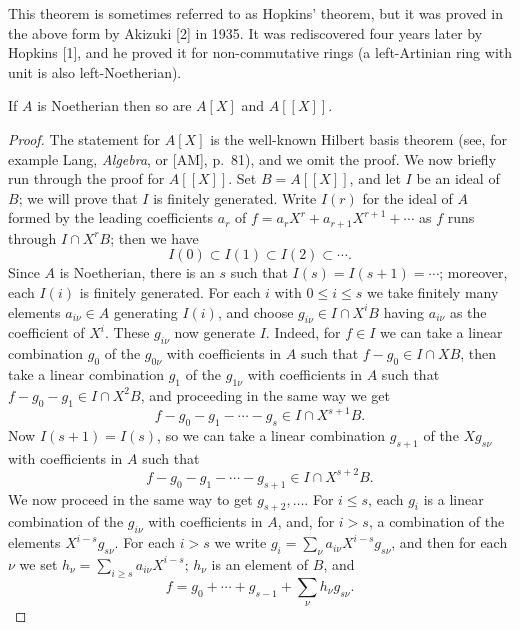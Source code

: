 \begin{remark}
This theorem is sometimes referred to as Hopkins' theorem, but it was proved in the
above form by Akizuki [2] in 1935. It was rediscovered four years later by Hopkins [1], and
he proved it for non-commutative rings (a left-Artinian ring with unit is also left-Noetherian).
\end{remark}

\begin{theorem}\label{thm:3.3}
If $A$ is Noetherian then so are $A[X]$ and $A[[X]]$.
\end{theorem}

\begin{proof}
The statement for $A[X]$ is the well-known Hilbert basis theorem
(see, for example Lang, \textit{Algebra}, or [AM], p.~81), and we omit the proof.
We now briefly run through the proof for $A[[X]]$. Set $B = A[[X]]$, and
let $I$ be an ideal of $B$; we will prove that $I$ is finitely generated. Write
$I(r)$ for the ideal of $A$ formed by the leading coefficients $a_r$ of
$f = a_rX^r + a_{r+1}X^{r+1} + \cdots$ as $f$ runs through $I \cap X^rB$; then we have
\[
  I(0) \subset I(1) \subset I(2) \subset \cdots .
\]
Since $A$ is Noetherian, there is an $s$ such that $I(s) = I(s+1) = \cdots$; moreover,
each $I(i)$ is finitely generated. For each $i$ with $0 \le i \le s$ we take finitely many
elements $a_{i\nu} \in A$ generating $I(i)$, and choose $g_{i\nu} \in I \cap X^iB$ having $a_{i\nu}$ as the
coefficient of $X^i$. These $g_{i\nu}$ now generate $I$. Indeed, for $f \in I$ we can take
a linear combination $g_0$ of the $g_{0\nu}$ with coefficients in $A$ such that
$f - g_0 \in I \cap XB$, then take a linear combination $g_1$ of the $g_{1\nu}$ with
coefficients in $A$ such that $f - g_0 - g_1 \in I \cap X^2B$, and proceeding in
the same way we get
\[
  f - g_0 - g_1 - \cdots - g_s \in I \cap X^{s+1}B.
\]
Now $I(s+1) = I(s)$, so we can take a linear combination $g_{s+1}$ of the $Xg_{s\nu}$
with coefficients in $A$ such that
\[
  f - g_0 - g_1 - \cdots - g_{s+1} \in I \cap X^{s+2}B.
\]
We now proceed in the same way to get $g_{s+2}, \ldots$. For $i \le s$, each $g_i$
is a linear combination of the $g_{i\nu}$ with coefficients in $A$, and, for
$i > s$, a combination of the elements $X^{i-s}g_{s\nu}$. For each $i > s$ we write
$g_i = \sum_\nu a_{i\nu}X^{i-s}g_{s\nu}$, and then for each $\nu$ we set
$h_\nu = \sum_{i \ge s} a_{i\nu}X^{i-s}$; $h_\nu$ is an element of $B$, and
\[
  f = g_0 + \cdots + g_{s-1} + \sum_\nu h_\nu g_{s\nu}.
\]
\end{proof}

